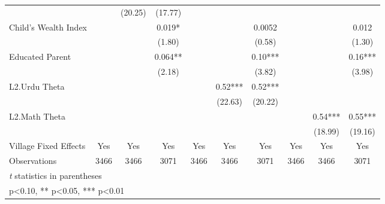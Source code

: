 \begin{sidewaystable}[htbp]
\begin{tabular}{l*{9}{c}}
                &            &  (20.25)   &  (17.77)   &            &            &            &            &            &            \\
Child's Wealth Index&            &            &    0.019*  &            &            &   0.0052   &            &            &    0.012   \\
                &            &            &   (1.80)   &            &            &   (0.58)   &            &            &   (1.30)   \\
Educated Parent &            &            &    0.064** &            &            &     0.10***&            &            &     0.16***\\
                &            &            &   (2.18)   &            &            &   (3.82)   &            &            &   (3.98)   \\
L2.Urdu Theta   &            &            &            &            &     0.52***&     0.52***&            &            &            \\
                &            &            &            &            &  (22.63)   &  (20.22)   &            &            &            \\
L2.Math Theta   &            &            &            &            &            &            &            &     0.54***&     0.55***\\
                &            &            &            &            &            &            &            &  (18.99)   &  (19.16)   \\
Village Fixed Effects&      Yes   &      Yes   &      Yes   &      Yes   &      Yes   &      Yes   &      Yes   &      Yes   &      Yes   \\
\midrule
Observations    &     3466   &     3466   &     3071   &     3466   &     3466   &     3071   &     3466   &     3466   &     3071   \\
\bottomrule
\multicolumn{10}{l}{\footnotesize \textit{t} statistics in parentheses}\\
\multicolumn{10}{l}{\footnotesize * p<0.10, ** p<0.05, *** p<0.01}\\
\end{tabular}
\end{sidewaystable}
